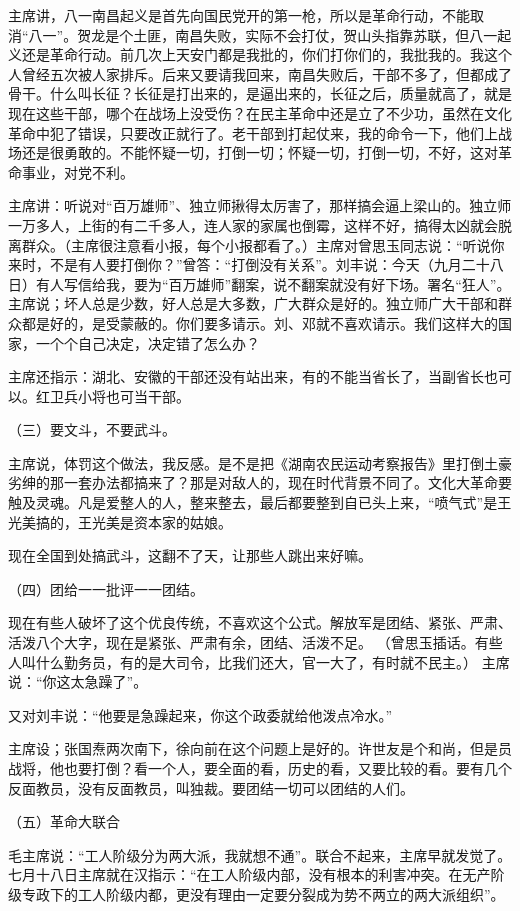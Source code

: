 主席讲，八一南昌起义是首先向国民党开的第一枪，所以是革命行动，不能取消“八一”。贺龙是个土匪，南昌失败，实际不会打仗，贺山头指靠苏联，但八一起义还是革命行动。前几次上天安门都是我批的，你们打你们的，我批我的。我这个人曾经五次被人家排斥。后来又要请我回来，南昌失败后，干部不多了，但都成了骨干。什么叫长征？长征是打出来的，是逼出来的，长征之后，质量就高了，就是现在这些干部，哪个在战场上没受伤？在民主革命中还是立了不少功，虽然在文化革命中犯了错误，只要改正就行了。老干部到打起仗来，我的命令一下，他们上战场还是很勇敢的。不能怀疑一切，打倒一切；怀疑一切，打倒一切，不好，这对革命事业，对党不利。

主席讲：听说对“百万雄师”、独立师揪得太厉害了，那样搞会逼上梁山的。独立师一万多人，上街的有二千多人，连人家的家属也倒霉，这样不好，搞得太凶就会脱离群众。（主席很注意看小报，每个小报都看了。）主席对曾思玉同志说：“听说你来时，不是有人要打倒你？”曾答：“打倒没有关系”。刘丰说：今天（九月二十八日）有人写信给我，要为“百万雄师”翻案，说不翻案就没有好下场。署名“狂人”。主席说；坏人总是少数，好人总是大多数，广大群众是好的。独立师广大干部和群众都是好的，是受蒙蔽的。你们要多请示。刘、邓就不喜欢请示。我们这样大的国家，一个个自己决定，决定错了怎么办？

主席还指示：湖北、安徽的干部还没有站出来，有的不能当省长了，当副省长也可以。红卫兵小将也可当干部。

（三）要文斗，不要武斗。

主席说，体罚这个做法，我反感。是不是把《湖南农民运动考察报告》里打倒土豪劣绅的那一套办法都搞来了？那是对敌人的，现在时代背景不同了。文化大革命要触及灵魂。凡是爱整人的人，整来整去，最后都要整到自已头上来，“喷气式”是王光美搞的，王光美是资本家的姑娘。

现在全国到处搞武斗，这翻不了天，让那些人跳出来好嘛。

（四）团给一一批评一一团结。

现在有些人破坏了这个优良传统，不喜欢这个公式。解放军是团结、紧张、严肃、活泼八个大字，现在是紧张、严肃有余，团结、活泼不足。  （曾思玉插话。有些人叫什么勤务员，有的是大司令，比我们还大，官一大了，有时就不民主。） 主席说：“你这太急躁了”。

又对刘丰说：“他要是急躁起来，你这个政委就给他泼点冷水。”

主席设；张国焘两次南下，徐向前在这个问题上是好的。许世友是个和尚，但是员战将，他也要打倒？看一个人，要全面的看，历史的看，又要比较的看。要有几个反面教员，没有反面教员，叫独裁。要团结一切可以团结的人们。

（五）革命大联合

毛主席说：“工人阶级分为两大派，我就想不通”。联合不起来，主席早就发觉了。七月十八日主席就在汉指示：“在工人阶级内部，没有根本的利害冲突。在无产阶级专政下的工人阶级内都，更没有理由一定要分裂成为势不两立的两大派组织”。

